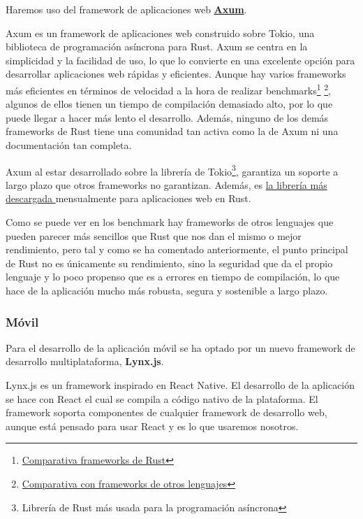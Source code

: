 Haremos uso del framework de aplicaciones web \href{https://github.com/tokio-rs/axum?tab=readme-ov-file}{\textbf{Axum}}.

Axum es un framework de aplicaciones web construido sobre Tokio, una biblioteca de programación asíncrona para Rust. Axum se centra en la simplicidad y la facilidad de uso, lo que lo convierte en una excelente opción para desarrollar aplicaciones web rápidas y eficientes.
Aunque hay varios frameworks más eficientes en términos de velocidad a la hora de realizar benchmarks\footnote{\href{https://web-frameworks-benchmark.netlify.app/result?l=rust}{Comparativa frameworks de Rust}} \footnote{\href{https://www.techempower.com/benchmarks/\#section=data-r21&test=composite&hw=ph}{Comparativa con frameworks de otros lenguajes}}, algunos de ellos tienen un tiempo de compilación demasiado alto, por lo que puede llegar a hacer más lento el desarrollo.
Además, ninguno de los demás frameworks de Rust tiene una comunidad tan activa como la de Axum ni una documentación tan completa.

Axum al estar desarrollado sobre la librería de Tokio\footnote{Librería de Rust más usada para la programación asíncrona}, garantiza un soporte a largo plazo que otros frameworks no garantizan. Además, es \href{https://lib.rs/crates/axum}{la librería más descargada }mensualmente para aplicaciones web en Rust.  

Como se puede ver en los benchmark hay frameworks de otros lenguajes que pueden parecer más sencillos que Rust que nos dan el mismo o mejor rendimiento, pero tal y como se ha comentado anteriormente, el punto principal de Rust no es únicamente su rendimiento, sino la seguridad que da el propio lenguaje y lo poco propenso que es a errores en tiempo de compilación, lo que hace de la aplicación mucho más robusta, segura y sostenible a largo plazo.


\subsubsection{Móvil}
Para el desarrollo de la aplicación móvil se ha optado por un nuevo framework de desarrollo multiplataforma, \textbf{Lynx.js}.

Lynx.js es un framework inspirado en React Native. El desarrollo de la aplicación se hace con React el cual se compila a código nativo de la plataforma. El framework soporta componentes de cualquier framework de desarrollo web, aunque está pensado para usar React y es lo que usaremos nosotros.

